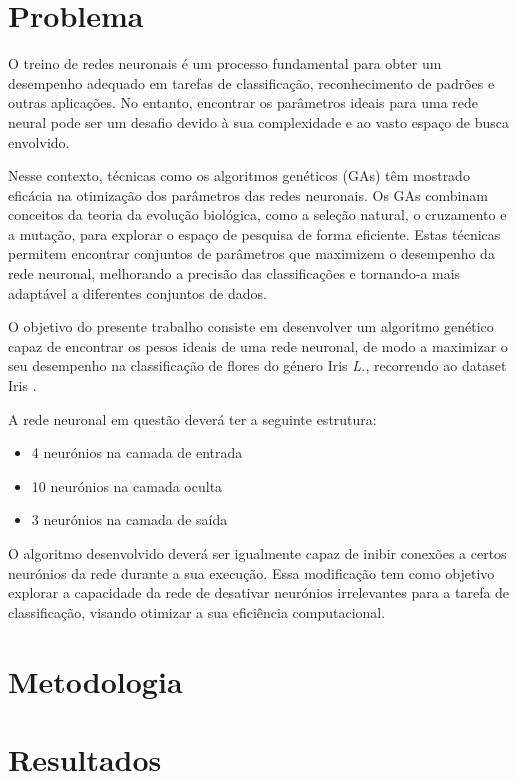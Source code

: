 \documentclass[a4paper, portuguese]{report}
\begin{document}
\chapter{Problema}\label{chapter:problem}

O treino de redes neuronais é um processo fundamental para obter um desempenho adequado em tarefas de classificação, reconhecimento de padrões e outras aplicações. No entanto, encontrar os parâmetros ideais para uma rede neural pode ser um desafio devido à sua complexidade e ao vasto espaço de busca envolvido. 

Nesse contexto, técnicas como os algoritmos genéticos (GAs) têm mostrado eficácia na otimização dos parâmetros das redes neuronais. Os GAs combinam conceitos da teoria da evolução biológica, como a seleção natural, o cruzamento e a mutação, para explorar o espaço de pesquisa de forma eficiente. Estas técnicas permitem encontrar conjuntos de parâmetros que maximizem o desempenho da rede neuronal, melhorando a precisão das classificações e tornando-a mais adaptável a diferentes conjuntos de dados.

O objetivo do presente trabalho consiste em desenvolver um algoritmo genético capaz de encontrar os pesos ideais de uma rede neuronal, de modo a maximizar o seu desempenho na classificação de flores do género Iris \textit{L.}, recorrendo ao dataset Iris \cite{Fisher1988}. 

A rede neuronal em questão deverá ter a seguinte estrutura:
\begin{itemize}
    \item 4 neurónios na camada de entrada
    \item 10 neurónios na camada oculta
    \item 3 neurónios na camada de saída
\end{itemize}

O algoritmo desenvolvido deverá ser igualmente capaz de inibir conexões a certos neurónios da rede durante a sua execução. Essa modificação tem como objetivo explorar a capacidade da rede de desativar neurónios irrelevantes para a tarefa de classificação, visando otimizar a sua eficiência computacional.

\chapter{Metodologia}\label{chapter:methodology}


\chapter{Resultados}\label{chapter:results}

\end{document}
